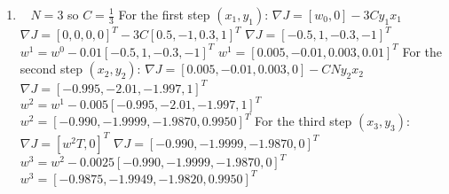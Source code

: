 \documentclass[12pt, fullpage,letterpaper]{article}
\begin{document}
\begin{enumerate}
		
	\item~
	\newline $N=3$ so $C=\frac{1}{3}$
	\newline For the first step $(x_1,y_1)$:
	\newline $\nabla J = [w_0,0]-3Cy_1x_1$
	\newline $\nabla J = [0,0,0,0]^T-3C[0.5,-1,0.3,1]^T$
	\newline $\nabla J = [-0.5,1,-0.3,-1]^T$
	\newline $w^1=w^0-0.01[-0.5,1,-0.3,-1]^T$
	\newline $w^1=[0.005,-0.01,0.003,0.01]^T$
	\newline 
	\newline For the second step $(x_2, y_2)$:
	\newline $\nabla J=[0.005,-0.01,0.003,0]-CNy_2x_2$
	\newline $\nabla J=[-0.995,-2.01,-1.997,1]^T$
	\newline $w^2=w^1-0.005[-0.995,-2.01,-1.997,1]^T$
	\newline $w^2=[-0.990,-1.9999,-1.9870,0.9950]^T$
	\newline
	\newline For the third step $(x_3, y_3)$:
	\newline $\nabla J=[w^2T,0]^T$
	\newline $\nabla J =[-0.990,-1.9999,-1.9870,0]^T$
	\newline $w^3=w^2-0.0025[-0.990,-1.9999,-1.9870,0]^T$
	\newline $w^3=[-0.9875,-1.9949,-1.9820,0.9950]^T$
	
\end{enumerate}
\end{document}
